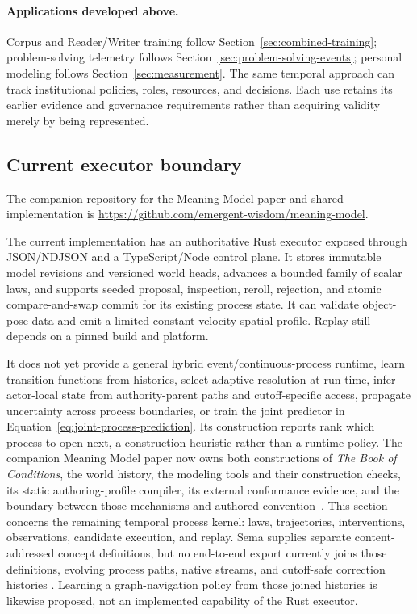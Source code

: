 \documentclass[10pt]{article}
\newcommand{\Book}{\textit{The Book of Conditions}}
\begin{document}
\paragraph{Applications developed above.}
Corpus and Reader/Writer training follow Section~\ref{sec:combined-training};
problem-solving telemetry follows Section~\ref{sec:problem-solving-events};
personal modeling follows Section~\ref{sec:measurement}. The same temporal
approach can track institutional policies, roles, resources, and decisions.
Each use retains its earlier evidence and governance requirements rather than
acquiring validity merely by being represented.

\subsection{Current executor boundary}
\label{sec:executor}

The companion repository for the Meaning Model paper and shared implementation
is \url{https://github.com/emergent-wisdom/meaning-model}.

The current implementation has an authoritative Rust executor exposed through
JSON/NDJSON and a TypeScript/Node control plane. It stores immutable model
revisions and versioned world heads, advances a bounded family of scalar laws,
and supports seeded proposal, inspection, reroll, rejection, and atomic
compare-and-swap commit for its existing process state. It can validate
object-pose data and emit a limited constant-velocity spatial profile. Replay
still depends on a pinned build and platform.

It does not yet provide a general hybrid event/continuous-process runtime,
learn transition functions from histories, select adaptive resolution at run
time, infer actor-local state from authority-parent paths and cutoff-specific
access, propagate uncertainty across process boundaries, or train the joint
predictor in Equation~\ref{eq:joint-process-prediction}. Its construction
reports rank which process to open next, a construction heuristic rather than
a runtime policy. The companion Meaning Model paper now owns both constructions
of \Book{}, the world history, the modeling tools and their construction
checks, its static authoring-profile compiler, its external conformance
evidence, and the boundary between those mechanisms and authored
convention~\cite{westerbergMeaning2026}. This section concerns the
remaining temporal process kernel: laws, trajectories, interventions,
observations, candidate execution, and replay. Sema supplies separate
content-addressed concept definitions, but no end-to-end export currently joins
those definitions, evolving process paths, native streams, and cutoff-safe
correction histories \cite{westerbergSema2026}.
Learning a graph-navigation policy from those joined histories is likewise
proposed, not an implemented capability of the Rust executor.
\end{document}
